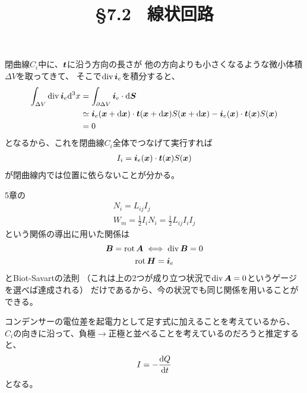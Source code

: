 \documentclass[a4paper, 12pt]{jsarticle}
\title{\S 7.2 \ 線状回路}
\theoremstyle{definition}
\def\vec#1{\mbox{\boldmath $#1$}}
\newcommand{\dif}[2]{\frac{{\rm d} #1}{{\rm d} #2}}
\newcommand{\pdif}[2]{\frac{\partial #1}{\partial #2}}
\newcommand{\ddif}{{\rm d}}
\DeclareMathOperator{\Div}{div}
\DeclareMathOperator{\Rot}{rot}
\begin{document}
\maketitle

閉曲線$C_i$中に、$\vec{t}$に沿う方向の長さが
他の方向よりも小さくなるような微小体積$\Delta V$を取ってきて、
そこで$\Div \vec{i}_e$を積分すると、
\begin{align}
	\int_{\Delta V} \Div \vec{i}_e \ddif^3 x
	&= \int_{\partial \Delta V} \vec{i}_e \cdot \ddif \vec{S} \\
	&\simeq \vec{i}_e (\vec{x} + \ddif \vec{x})
	\cdot \vec{t}(\vec{x} + \ddif \vec{x}) S(\vec{x} + \ddif \vec{x})
	- \vec{i}_e (\vec{x}) \cdot \vec{t}(\vec{x}) S(\vec{x}) \\
	&= 0
\end{align}
となるから、これを閉曲線$C_i$全体でつなげて実行すれば
\begin{align}
	I_i = \vec{i}_e (\vec{x}) \cdot \vec{t}(\vec{x}) S(\vec{x})
\end{align}
が閉曲線内では位置に依らないことが分かる。

5章の
\begin{gather}
	N_i = L_{ij} I_j\\
	W_m = \frac{1}{2} I_i N_i = \frac{1}{2} L_{ij} I_i I_j
\end{gather}
という関係の導出に用いた関係は
\begin{gather}
	\vec{B} = \Rot \vec{A}  \iff \Div \vec{B} = 0 \\
	\Rot \vec{H} = \vec{i}_e
\end{gather}
とBiot-Savartの法則
（これは上の2つが成り立つ状況で$\Div \vec{A} = 0$というゲージを選べば達成される）
だけであるから、今の状況でも同じ関係を用いることができる。

コンデンサーの電位差を起電力として足す式に加えることを考えているから、
$C_i$の向きに沿って、負極$\rightarrow$正極と並べることを考えているのだろうと推定すると、
\begin{align}
	I = - \dif{Q}{t}
\end{align}
となる。

\end{document}
